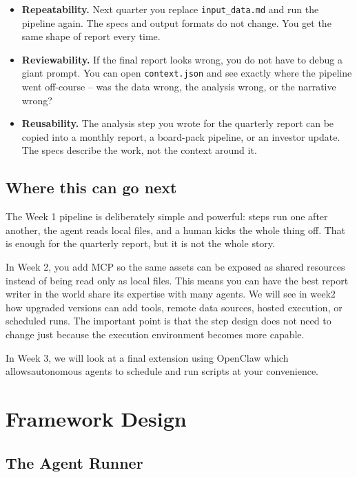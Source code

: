 \documentclass[12pt, a4paper]{article}
\begin{document}
\begin{itemize}[leftmargin=1.5em]
  \item \textbf{Repeatability.} Next quarter you replace \texttt{input\_data.md} and run the pipeline again. The specs and output formats do not change. You get the same shape of report every time.
  \item \textbf{Reviewability.} If the final report looks wrong, you do not have to debug a giant prompt. You can open \texttt{context.json} and see exactly where the pipeline went off-course -- was the data wrong, the analysis wrong, or the narrative wrong?
  \item \textbf{Reusability.} The analysis step you wrote for the quarterly report can be copied into a monthly report, a board-pack pipeline, or an investor update. The specs describe the work, not the context around it.
\end{itemize}

\subsection{Where this can go next}

The Week 1 pipeline is deliberately simple and powerful: steps run one after another, the agent reads local files, and a human kicks the whole thing off. That is enough for the quarterly report, but it is not the whole story.

In Week 2, you add MCP so the same assets can be exposed as shared resources instead of being read only as local files. This means you can have the best report writer in the world share its expertise with many agents. We will see in week2 how upgraded versions can add tools, remote data sources, hosted execution, or scheduled runs. The important point is that the step design does not need to change just because the execution environment becomes more capable.

In Week 3, we will look at a final extension using OpenClaw which allowsautonomous agents to schedule and run scripts at your convenience.

\clearpage

\section{Framework Design}

\subsection{The Agent Runner}
\end{document}
